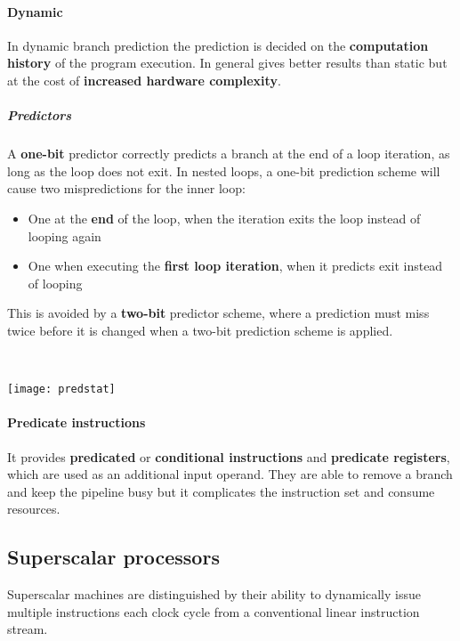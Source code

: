 \paragraph{Dynamic}
In dynamic branch prediction the prediction is decided on the \textbf{computation history} of the program execution. In general gives better results than static but at the cost of \textbf{increased hardware complexity}.
\subparagraph{Predictors}
A \textbf{one-bit} predictor correctly predicts a branch at the end of a loop iteration, as long as the loop does not exit. In nested loops, a one-bit prediction scheme will cause two mispredictions for the inner loop:
\begin{itemize}
	\item One at the \textbf{end} of the loop, when the iteration exits the loop instead of looping again
	\item One when executing the \textbf{first loop iteration}, when it predicts exit instead of looping
\end{itemize}
This is avoided by a \textbf{two-bit} predictor scheme, where a prediction must miss twice before it is changed when a two-bit prediction scheme is applied.
\begin{figure}[!h]
	\centering
	\hfill\\
	\hfill
	\hfill
\end{figure}

\begin{center}
	\texttt{[image: predstat]}
\end{center}

\paragraph{Predicate instructions}
It provides \textbf{predicated} or \textbf{conditional instructions} and \textbf{predicate registers}, which are used as an additional input operand. They are able to remove a branch and keep the pipeline busy but it complicates the instruction set and consume resources.

\subsection{Superscalar processors}
\begin{definition}
	Superscalar machines are distinguished by their ability to dynamically issue multiple instructions each clock cycle from a conventional linear instruction stream.
\end{definition}


